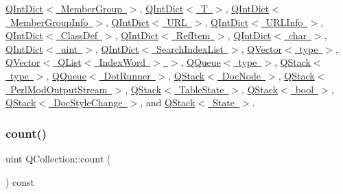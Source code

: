 \mbox{\hyperlink{class_q_int_dict_a7cc8164a6c6865c52151920c428d13ed}{Q\+Int\+Dict$<$ Member\+Group $>$}}, \mbox{\hyperlink{class_q_int_dict_a7cc8164a6c6865c52151920c428d13ed}{Q\+Int\+Dict$<$ T $>$}}, \mbox{\hyperlink{class_q_int_dict_a7cc8164a6c6865c52151920c428d13ed}{Q\+Int\+Dict$<$ Member\+Group\+Info $>$}}, \mbox{\hyperlink{class_q_int_dict_a7cc8164a6c6865c52151920c428d13ed}{Q\+Int\+Dict$<$ U\+R\+L $>$}}, \mbox{\hyperlink{class_q_int_dict_a7cc8164a6c6865c52151920c428d13ed}{Q\+Int\+Dict$<$ U\+R\+L\+Info $>$}}, \mbox{\hyperlink{class_q_int_dict_a7cc8164a6c6865c52151920c428d13ed}{Q\+Int\+Dict$<$ Class\+Def $>$}}, \mbox{\hyperlink{class_q_int_dict_a7cc8164a6c6865c52151920c428d13ed}{Q\+Int\+Dict$<$ Ref\+Item $>$}}, \mbox{\hyperlink{class_q_int_dict_a7cc8164a6c6865c52151920c428d13ed}{Q\+Int\+Dict$<$ char $>$}}, \mbox{\hyperlink{class_q_int_dict_a7cc8164a6c6865c52151920c428d13ed}{Q\+Int\+Dict$<$ uint $>$}}, \mbox{\hyperlink{class_q_int_dict_a7cc8164a6c6865c52151920c428d13ed}{Q\+Int\+Dict$<$ Search\+Index\+List $>$}}, \mbox{\hyperlink{class_q_vector_a1d9f67e27cf360cfec05312fd014da7a}{Q\+Vector$<$ type $>$}}, \mbox{\hyperlink{class_q_vector_a1d9f67e27cf360cfec05312fd014da7a}{Q\+Vector$<$ Q\+List$<$ Index\+Word $>$ $>$}}, \mbox{\hyperlink{class_q_queue_a39841ee54f380f58fb96be30eb5e7c89}{Q\+Queue$<$ type $>$}}, \mbox{\hyperlink{class_q_stack_a07ac0d10d6912270790d0c1a82ee2715}{Q\+Stack$<$ type $>$}}, \mbox{\hyperlink{class_q_queue_a39841ee54f380f58fb96be30eb5e7c89}{Q\+Queue$<$ Dot\+Runner $>$}}, \mbox{\hyperlink{class_q_stack_a07ac0d10d6912270790d0c1a82ee2715}{Q\+Stack$<$ Doc\+Node $>$}}, \mbox{\hyperlink{class_q_stack_a07ac0d10d6912270790d0c1a82ee2715}{Q\+Stack$<$ Perl\+Mod\+Output\+Stream $>$}}, \mbox{\hyperlink{class_q_stack_a07ac0d10d6912270790d0c1a82ee2715}{Q\+Stack$<$ Table\+State $>$}}, \mbox{\hyperlink{class_q_stack_a07ac0d10d6912270790d0c1a82ee2715}{Q\+Stack$<$ bool $>$}}, \mbox{\hyperlink{class_q_stack_a07ac0d10d6912270790d0c1a82ee2715}{Q\+Stack$<$ Doc\+Style\+Change $>$}}, and \mbox{\hyperlink{class_q_stack_a07ac0d10d6912270790d0c1a82ee2715}{Q\+Stack$<$ State $>$}}.

\mbox{\label{class_q_collection_a6441adbfb3ffb6f55ed834c0c0bcc6cb}} 
\subsubsection{\texorpdfstring{count()}{count()}}
{\footnotesize\ttfamily uint Q\+Collection\+::count (\begin{DoxyParamCaption}{ }\end{DoxyParamCaption}) const\hspace{0.3cm}{\ttfamily [pure virtual]}}

